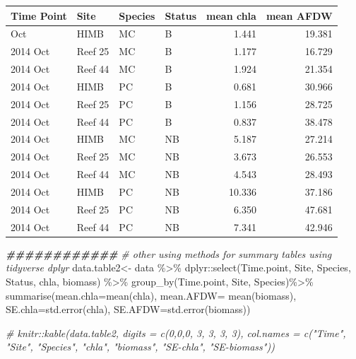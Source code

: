 \documentclass[
]{article}
\newenvironment{Shaded}{\begin{snugshade}}{\end{snugshade}}
\newcommand{\AttributeTok}[1]{\textcolor[rgb]{0.77,0.63,0.00}{#1}}
\newcommand{\CommentTok}[1]{\textcolor[rgb]{0.56,0.35,0.01}{\textit{#1}}}
\newcommand{\DocumentationTok}[1]{\textcolor[rgb]{0.56,0.35,0.01}{\textbf{\textit{#1}}}}
\newcommand{\FunctionTok}[1]{\textcolor[rgb]{0.00,0.00,0.00}{#1}}
\newcommand{\NormalTok}[1]{#1}
\newcommand{\OtherTok}[1]{\textcolor[rgb]{0.56,0.35,0.01}{#1}}
\newcommand{\SpecialCharTok}[1]{\textcolor[rgb]{0.00,0.00,0.00}{#1}}
\begin{document}
\begin{longtable}[]{@{}llllrr@{}}
\toprule\noalign{}
Time Point & Site & Species & Status & mean chla & mean AFDW \\
\midrule\noalign{}
\endhead
\bottomrule\noalign{}
\endlastfoot
2014 Oct & HIMB & MC & B & 1.441 & 19.381 \\
2014 Oct & Reef 25 & MC & B & 1.177 & 16.729 \\
2014 Oct & Reef 44 & MC & B & 1.924 & 21.354 \\
2014 Oct & HIMB & PC & B & 0.681 & 30.966 \\
2014 Oct & Reef 25 & PC & B & 1.156 & 28.725 \\
2014 Oct & Reef 44 & PC & B & 0.837 & 38.478 \\
2014 Oct & HIMB & MC & NB & 5.187 & 27.214 \\
2014 Oct & Reef 25 & MC & NB & 3.673 & 26.553 \\
2014 Oct & Reef 44 & MC & NB & 4.543 & 28.493 \\
2014 Oct & HIMB & PC & NB & 10.336 & 37.186 \\
2014 Oct & Reef 25 & PC & NB & 6.350 & 47.681 \\
2014 Oct & Reef 44 & PC & NB & 7.341 & 42.946 \\
\end{longtable}

\begin{Shaded}
\begin{Highlighting}[]
\DocumentationTok{\#\#\#\#\#\#\#\#\#\#\#\#}
\CommentTok{\# other using methods for summary tables using \textquotesingle{}tidyverse\textquotesingle{} dplyr}
\NormalTok{data.table2}\OtherTok{\textless{}{-}}\NormalTok{ data }\SpecialCharTok{\%\textgreater{}\%}\NormalTok{ dplyr}\SpecialCharTok{::}\FunctionTok{select}\NormalTok{(Time.point, Site, Species, Status, chla, biomass) }\SpecialCharTok{\%\textgreater{}\%}
  \FunctionTok{group\_by}\NormalTok{(Time.point, Site, Species)}\SpecialCharTok{\%\textgreater{}\%}
  \FunctionTok{summarise}\NormalTok{(}\AttributeTok{mean.chla=}\FunctionTok{mean}\NormalTok{(chla), }\AttributeTok{mean.AFDW=} \FunctionTok{mean}\NormalTok{(biomass), }
            \AttributeTok{SE.chla=}\FunctionTok{std.error}\NormalTok{(chla), }\AttributeTok{SE.AFDW=}\FunctionTok{std.error}\NormalTok{(biomass))}

\CommentTok{\# knitr::kable(data.table2, digits = c(0,0,0, 3, 3, 3, 3), col.names = c("Time", "Site", "Species", "chla", "biomass", "SE{-}chla", "SE{-}biomass"))}
\end{Highlighting}
\end{Shaded}
\end{document}
